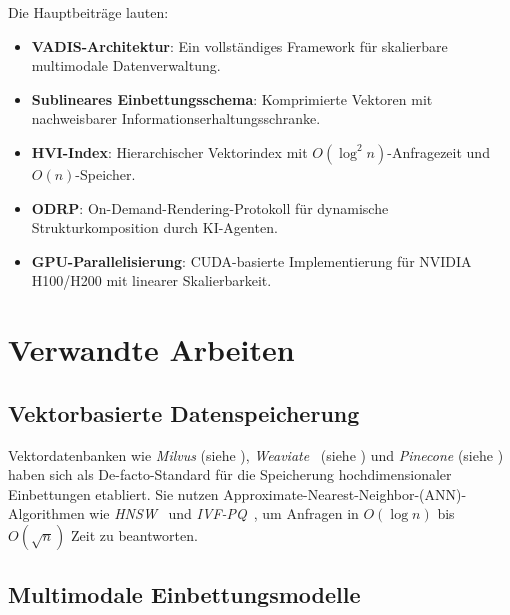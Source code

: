 ﻿\documentclass[12pt,a4paper]{article}
\begin{document}
Die Hauptbeiträge lauten:
\begin{itemize}[leftmargin=1.2em, itemsep=0pt, topsep=2pt]
  \item \textbf{VADIS-Architektur}: Ein vollständiges Framework für 
        skalierbare multimodale Datenverwaltung.
  \item \textbf{Sublineares Einbettungsschema}: Komprimierte Vektoren 
        mit nachweisbarer Informationserhaltungsschranke.
  \item \textbf{HVI-Index}: Hierarchischer Vektorindex mit 
        $O(\log^2 n)$-Anfragezeit und $O(n)$-Speicher.
  \item \textbf{ODRP}: On-Demand-Rendering-Protokoll für 
        dynamische Strukturkomposition durch KI-Agenten.
  \item \textbf{GPU-Parallelisierung}: CUDA-basierte Implementierung 
        für NVIDIA H100/H200 mit linearer Skalierbarkeit.
\end{itemize}

\section{Verwandte Arbeiten}
\label{sec:related}

\subsection{Vektorbasierte Datenspeicherung}

Vektordatenbanken wie \textit{Milvus} (siehe \cite{wang2021milvus}), 
\textit{Weaviate}~ (siehe \cite{weaviate2023}) und \textit{Pinecone} (siehe \cite{pinecone2022}) 
haben sich als De-facto-Standard für die Speicherung hochdimensionaler 
Einbettungen etabliert. Sie nutzen Approximate-Nearest-Neighbor-(ANN)-Algorithmen 
wie \textit{HNSW}~\cite{malkov2018hnsw} und \textit{IVF-PQ}~\cite{johnson2019faiss}, 
um Anfragen in $O(\log n)$ bis $O(\sqrt{n})$ Zeit zu beantworten.

\subsection{Multimodale Einbettungsmodelle}
\end{document}
